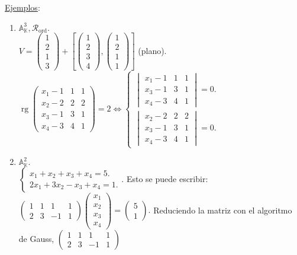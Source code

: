 \documentclass[11pt]{article}
\newcommand{\af}{\mathbb{A}}
\newcommand{\ej}{\underline{Ejemplos}:\\}
\DeclareMathOperator{\rg}{rg}
\begin{document}
\newpage
\ej
\begin{enumerate}
	\item $\af^3_{\mathbb{K}},\mathcal{R}_{\textrm{ord}}.$\\
	$V=\begin{pmatrix}
	1\\ 2\\ 1\\ 3
	\end{pmatrix}+\left[\begin{pmatrix}
	1\\ 2\\ 3\\ 4
	\end{pmatrix},\begin{pmatrix}
	1\\ 2\\ 1\\ 1
	\end{pmatrix}\right]$ (plano). $\rg\begin{pmatrix}
	x_1-1 & 1 & 1\\
	x_2-2 & 2 & 2\\
	x_3-1 & 3 & 1\\
	x_4-3 & 4 & 1
	\end{pmatrix}=2\iff\begin{cases}\begin{vmatrix}
	x_1-1 & 1 & 1\\
	x_3-1 & 3 & 1\\
	x_4-3 & 4 & 1
	\end{vmatrix}=0.\\
	\begin{vmatrix}
	x_2-2 & 2 & 2\\
	x_3-1 & 3 & 1\\
	x_4-3 & 4 & 1
	\end{vmatrix}=0.
	\end{cases}$
	\item $\af^2_{\mathbb{K}}.$\\
	$\begin{cases}
	x_1+x_2+x_3+x_4=5.\\
	2x_1+3x_2-x_3+x_4=1.
	\end{cases}$. Esto se puede escribir:
	$\begin{pmatrix}
	1 & 1 & 1 & 1\\
	2 & 3 & -1 & 1
	\end{pmatrix}\begin{pmatrix}
	x_1\\ x_2\\ x_3\\ x_4
	\end{pmatrix}=\begin{pmatrix}
	5\\ 1
	\end{pmatrix}.$ Reduciendo la matriz con el algoritmo de Gauss, $\begin{pmatrix}
	1 & 1 & 1 & 1\\
	2 & 3 & -1 & 1
	\end{pmatrix}$
\end{enumerate}
\end{document}
